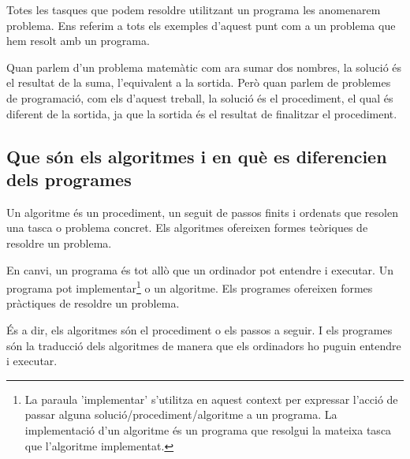Totes les tasques que podem resoldre utilitzant un programa les anomenarem problema. Ens referim a tots els exemples d'aquest punt com a un problema que hem resolt amb un programa. 

Quan parlem d'un problema matemàtic com ara sumar dos nombres, la solució és el resultat de la suma, l'equivalent a la sortida. Però quan parlem de problemes de programació, com els d'aquest treball, la solució és el procediment, el qual és diferent de la sortida, ja que la sortida és el resultat de finalitzar el procediment.

\subsection{Que són els algoritmes i en què es diferencien dels programes}
Un algoritme és un procediment, un seguit de passos finits i ordenats que resolen una tasca o problema concret. Els algoritmes ofereixen formes teòriques de resoldre un problema.

En canvi, un programa és tot allò que un ordinador pot entendre i executar. Un programa pot implementar\footnote{La paraula 'implementar' s'utilitza en aquest context per expressar l'acció de passar alguna solució/procediment/algoritme a un programa. La implementació d'un algoritme és un programa que resolgui la mateixa tasca que l'algoritme implementat.} o  un algoritme. Els programes ofereixen formes pràctiques de resoldre un problema.

És a dir, els algoritmes són el procediment o els passos a seguir. I els programes són la traducció dels algoritmes de manera que els ordinadors ho puguin entendre i executar.


